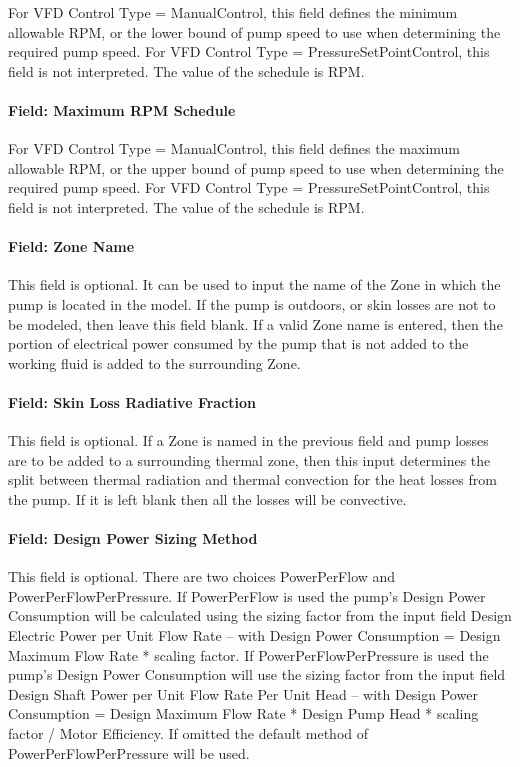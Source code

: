 For VFD Control Type = ManualControl, this field defines the minimum allowable RPM, or
the lower bound of pump speed to use when determining the required pump speed. For VFD Control Type = PressureSetPointControl, this field is not interpreted. The value of the schedule is RPM.

\paragraph{Field: Maximum RPM Schedule}\label{field-maximum-rpm-schedule}

For VFD Control Type = ManualControl, this field defines the maximum allowable RPM, or
the upper bound of pump speed to use when determining the required pump speed. For VFD Control Type = PressureSetPointControl, this field is not interpreted. The value of the schedule is RPM.

\paragraph{Field: Zone Name}\label{field-zone-name-008}

This field is optional. It can be used to input the name of the Zone in which the pump is located in the model. If the pump is outdoors, or skin losses are not to be modeled, then leave this field blank. If a valid Zone name is entered, then the portion of electrical power consumed by the pump that is not added to the working fluid is added to the surrounding Zone.

\paragraph{Field: Skin Loss Radiative Fraction}\label{field-skin-loss-radiative-fraction-000}

This field is optional. If a Zone is named in the previous field and pump losses are to be added to a surrounding thermal zone, then this input determines the split between thermal radiation and thermal convection for the heat losses from the pump. If it is left blank then all the losses will be convective.

\paragraph{Field: Design Power Sizing Method}\label{field-design-power-sizing-method}

This field is optional. There are two choices PowerPerFlow and PowerPerFlowPerPressure. If PowerPerFlow is used the pump's Design Power Consumption will be calculated using the sizing factor from the input field Design Electric Power per Unit Flow Rate -- with Design Power Consumption = Design Maximum Flow Rate * scaling factor. If PowerPerFlowPerPressure is used the pump's Design Power Consumption will use the sizing factor from the input field Design Shaft Power per Unit Flow Rate Per Unit Head -- with Design Power Consumption = Design Maximum Flow Rate * Design Pump Head * scaling factor / Motor Efficiency. If omitted the default method of PowerPerFlowPerPressure will be used.


